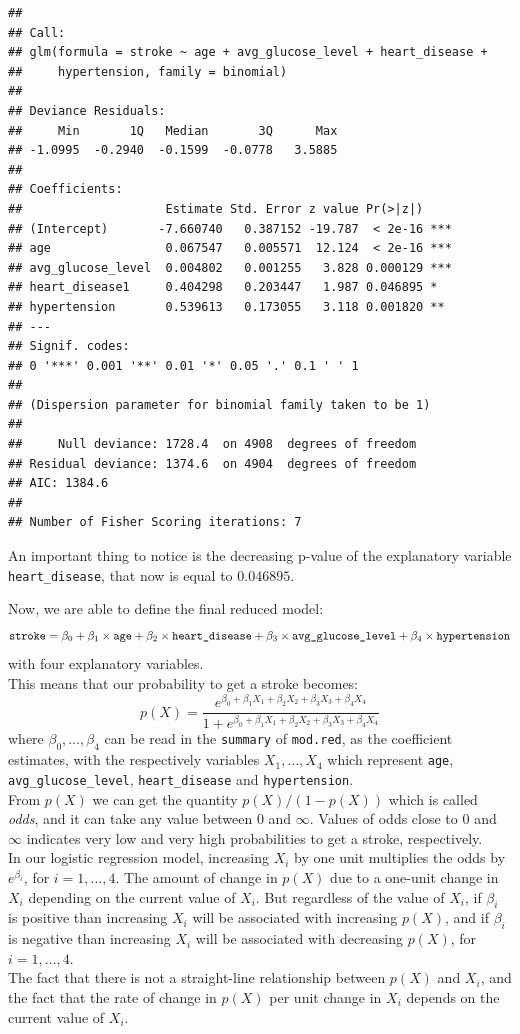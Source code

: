 \documentclass[
]{article}
\begin{document}
\begin{verbatim}
## 
## Call:
## glm(formula = stroke ~ age + avg_glucose_level + heart_disease + 
##     hypertension, family = binomial)
## 
## Deviance Residuals: 
##     Min       1Q   Median       3Q      Max  
## -1.0995  -0.2940  -0.1599  -0.0778   3.5885  
## 
## Coefficients:
##                    Estimate Std. Error z value Pr(>|z|)    
## (Intercept)       -7.660740   0.387152 -19.787  < 2e-16 ***
## age                0.067547   0.005571  12.124  < 2e-16 ***
## avg_glucose_level  0.004802   0.001255   3.828 0.000129 ***
## heart_disease1     0.404298   0.203447   1.987 0.046895 *  
## hypertension       0.539613   0.173055   3.118 0.001820 ** 
## ---
## Signif. codes:  
## 0 '***' 0.001 '**' 0.01 '*' 0.05 '.' 0.1 ' ' 1
## 
## (Dispersion parameter for binomial family taken to be 1)
## 
##     Null deviance: 1728.4  on 4908  degrees of freedom
## Residual deviance: 1374.6  on 4904  degrees of freedom
## AIC: 1384.6
## 
## Number of Fisher Scoring iterations: 7
\end{verbatim}

An important thing to notice is the decreasing p-value of the explanatory variable \texttt{heart\_disease}, that now is equal to \(0.046895\).

Now, we are able to define the final reduced model:
\[\verb|stroke| = \beta_0 + \beta_1\times \verb|age| + \beta_2\times \verb|heart_disease| + \beta_3 \times  \verb|avg_glucose_level| + \beta_4 \times\verb|hypertension|\]
with four explanatory variables.\\
This means that our probability to get a stroke becomes:
\[p(X)= \frac{e^{\beta_0+\beta_1X_1 + \beta_2X_2+\beta_3 X_3+\beta_4 X_4}}{1+e^{\beta_0+\beta_1X_1 + \beta_2X_2+\beta_3 X_3+\beta_4 X_4}}\]
where \(\beta_0, \dots, \beta_4\) can be read in the \texttt{summary} of
\texttt{mod.red}, as the coefficient estimates, with the respectively
variables \(X_1, \dots, X_4\) which represent \texttt{age},
\texttt{avg\_glucose\_level}, \texttt{heart\_disease} and
\texttt{hypertension}.\\
From \(p(X)\) we can get the quantity \(p(X)/(1-p(X))\) which is called
\emph{odds}, and it can take any value between \(0\) and \(\infty\).
Values of odds close to \(0\) and \(\infty\) indicates very low and very
high probabilities to get a stroke, respectively.\\
In our logistic regression model, increasing \(X_i\) by one unit
multiplies the odds by \(e^{\beta_i}\), for \(i=1, \dots, 4\). The
amount of change in \(p(X)\) due to a one-unit change in \(X_i\) depending
on the current value of \(X_i\). But regardless of the value of \(X_i\),
if \(\beta_i\) is positive than increasing \(X_i\) will be associated
with increasing \(p(X)\), and if \(\beta_i\) is negative than increasing
\(X_i\) will be associated with decreasing \(p(X)\), for
\(i=1, \dots, 4\).\\
The fact that there is not a straight-line relationship between \(p(X)\)
and \(X_i\), and the fact that the rate of change in \(p(X)\) per unit
change in \(X_i\) depends on the current value of \(X_i\).
\end{document}
